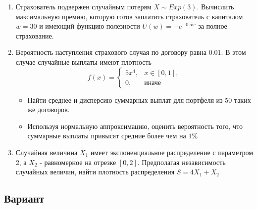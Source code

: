 \documentclass[12pt, letterpaper]{article}
\begin{document}
\begin{enumerate}
	\item 
	

	Страхователь подвержен случайным потерям $X \sim Exp(3)$.
	Вычислить максимальную премию, которую готов заплатить страхователь с капиталом $w=30$ и имеющий функцию полезности $U(w) = -e^{-0.5w}$ за полное страхование.
	\item
	Вероятность наступления страхового случая по договору равна $0.01$. В этом случае случайные выплаты имеют плотность
	\[
	f(x) = 
	\begin{cases}
		5x^4, & x \in [0, 1],\\
		0, & \text{иначе}
	\end{cases}
	\]
	\begin{itemize}
		\item Найти среднее и дисперсию суммарных выплат для портфеля из 50 таких же договоров.
		\item Используя нормальную аппроксимацию, оценить вероятность того, что суммарные выплаты привысят средние более чем на $1\%$
	\end{itemize}
	
	\item
	Случайная величина $X_1$ имеет экспоненциальное распределение с параметром 2, а $X_2$ - равномерное на отрезке $[0, 2]$.
	Предполагая независимость случайных величин, найти плотность распределения $S = 4X_1 + X_2$
\end{enumerate}


\newpage
\begin{center}
	\section{Вариант}
\end{center}
\end{document}
